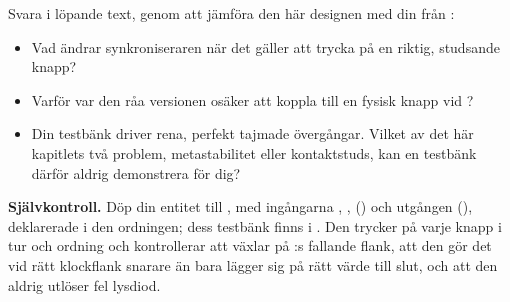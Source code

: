  Svara i löpande text, genom att jämföra den här designen med din  från
:
\begin{itemize}
  \item Vad ändrar synkroniseraren när det gäller att trycka på en riktig, studsande knapp?
  \item Varför var den råa versionen osäker att koppla till en fysisk knapp vid ?
  \item Din testbänk driver rena, perfekt tajmade övergångar. Vilket av det här kapitlets två
    problem, metastabilitet eller kontaktstuds, kan en testbänk därför aldrig demonstrera för dig?
\end{itemize}


\begin{selfcheck}
\textbf{Självkontroll.} Döp din entitet till , med ingångarna ,
,  () och utgången 
(), deklarerade i den ordningen; dess testbänk finns i
. Den trycker på varje knapp i tur och ordning och kontrollerar
att  växlar på :s fallande flank, att den gör det vid rätt
klockflank snarare än bara lägger sig på rätt värde till slut, och att den aldrig utlöser fel
lysdiod.
\end{selfcheck}
